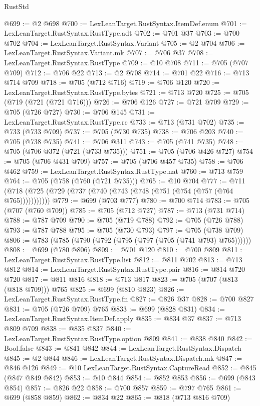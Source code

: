 \begin{lexlean}{RustStd}
\begin{coremodule}
@699 := @2 @698
@700 := LexLeanTarget.RustSyntax.ItemDef.enum
@701 := LexLeanTarget.RustSyntax.RustType.adt
@702 := @701 @37
@703 := @700 @702
@704 := LexLeanTarget.RustSyntax.Variant
@705 := @2 @704
@706 := LexLeanTarget.RustSyntax.Variant.mk
@707 := @706 @37
@708 := LexLeanTarget.RustSyntax.RustType
@709 := @10 @708
@711 := @705 (@707 @709)
@712 := @706 @22
@713 := @2 @708
@714 := @701 @22
@716 := @713 @714 @709
@718 := @705 (@712 @716)
@719 := @706 @120
@720 := LexLeanTarget.RustSyntax.RustType.bytes
@721 := @713 @720
@725 := @705 (@719 (@721 (@721 @716)))
@726 := @706 @126
@727 := @721 @709
@729 := @705 (@726 @727)
@730 := @706 @145
@731 := LexLeanTarget.RustSyntax.RustType.rc
@733 := @713 (@731 @702)
@735 := @733 (@733 @709)
@737 := @705 (@730 @735)
@738 := @706 @203
@740 := @705 (@738 @735)
@741 := @706 @311
@743 := @705 (@741 @735)
@748 := @705 (@706 @372 (@721 (@733 @735)))
@751 := @705 (@706 @426 @727)
@754 := @705 (@706 @431 @709)
@757 := @705 (@706 @457 @735)
@758 := @706 @462
@759 := LexLeanTarget.RustSyntax.RustType.nat
@760 := @713 @759
@764 := @705 (@758 (@760 (@721 @735)))
@765 := @10 @704
@777 := @711 (@718 (@725 (@729 (@737 (@740 (@743 (@748 (@751 (@754 (@757 (@764 @765)))))))))))
@779 := @699 (@703 @777)
@780 := @700 @714
@783 := @705 (@707 (@760 @709))
@785 := @705 (@712 @727)
@787 := @713 (@731 @714)
@788 := @787 @709
@790 := @705 (@719 @788)
@792 := @705 (@726 @788)
@793 := @787 @788
@795 := @705 (@730 @793)
@797 := @705 (@738 @709)
@806 := @783 (@785 (@790 (@792 (@795 (@797 (@705 (@741 @793) @765))))))
@808 := @699 (@780 @806)
@809 := @701 @120
@810 := @700 @809
@811 := LexLeanTarget.RustSyntax.RustType.list
@812 := @811 @702
@813 := @713 @812
@814 := LexLeanTarget.RustSyntax.RustType.pair
@816 := @814 @720 @720
@817 := @811 @816
@818 := @713 @817
@823 := @705 (@707 (@813 (@818 @709))) @765
@825 := @699 (@810 @823)
@826 := LexLeanTarget.RustSyntax.RustType.fn
@827 := @826 @37
@828 := @700 @827
@831 := @705 (@726 @709) @765
@833 := @699 (@828 @831)
@834 := LexLeanTarget.RustSyntax.ItemDef.apply
@835 := @834 @37
@837 := @713 @809 @709
@838 := @835 @837
@840 := LexLeanTarget.RustSyntax.RustType.option @809
@841 := @838 @840
@842 := Bool.false
@843 := @841 @842
@844 := LexLeanTarget.RustSyntax.Dispatch
@845 := @2 @844
@846 := LexLeanTarget.RustSyntax.Dispatch.mk
@847 := @846 @126
@849 := @10 LexLeanTarget.RustSyntax.CaptureRead
@852 := @845 (@847 @849 @842)
@853 := @10 @844
@854 := @852 @853
@856 := @699 (@843 @854)
@857 := @826 @22
@858 := @700 @857
@859 := @797 @765
@861 := @699 (@858 @859)
@862 := @834 @22
@865 := @818 (@713 @816 @709)

\end{coremodule}
\end{lexlean}
